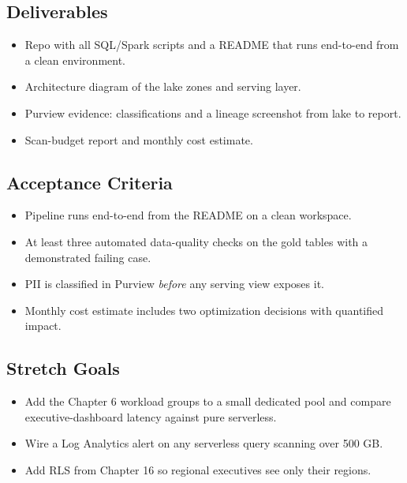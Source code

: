 \subsection*{Deliverables}
\begin{itemize}
    \item Repo with all SQL/Spark scripts and a README that runs end-to-end from a clean environment.
    \item Architecture diagram of the lake zones and serving layer.
    \item Purview evidence: classifications and a lineage screenshot from lake to report.
    \item Scan-budget report and monthly cost estimate.
\end{itemize}

\subsection*{Acceptance Criteria}
\begin{itemize}
    \item Pipeline runs end-to-end from the README on a clean workspace.
    \item At least three automated data-quality checks on the gold tables with a demonstrated failing case.
    \item PII is classified in Purview \emph{before} any serving view exposes it.
    \item Monthly cost estimate includes two optimization decisions with quantified impact.
\end{itemize}

\subsection*{Stretch Goals}
\begin{itemize}
    \item Add the Chapter 6 workload groups to a small dedicated pool and compare executive-dashboard latency against pure serverless.
    \item Wire a Log Analytics alert on any serverless query scanning over 500 GB.
    \item Add RLS from Chapter 16 so regional executives see only their regions.
\end{itemize}

